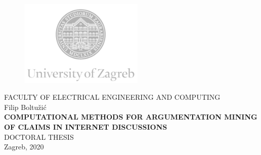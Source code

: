 \frontmatter

\begin{titlepage}
  \fontsize{16pt}{20pt}\selectfont
  \selectfont
  \setlength{\intextsep}{0pt plus 0pt minus 0pt}

  \begin{center}
    \begin{figure}[ht!]
      \begin{center}
        \includegraphics[height=4.1184cm, width=5.94cm]{logo_unizg_eng}
      \end{center}
    \end{figure}
    \vspace{0cm}
    {FACULTY OF ELECTRICAL ENGINEERING AND COMPUTING} \\
    \vspace{3cm}
    Filip Boltužić \\
    \vspace{2cm}
    {\fontsize{22pt}{22pt}\selectfont
\textbf{
COMPUTATIONAL METHODS FOR ARGUMENTATION MINING OF CLAIMS IN INTERNET DISCUSSIONS}} \\
    \vspace{2cm}  
    DOCTORAL THESIS \\    
    \vfill{Zagreb, 2020}
  \end{center}
  \restoregeometry
\end{titlepage}

